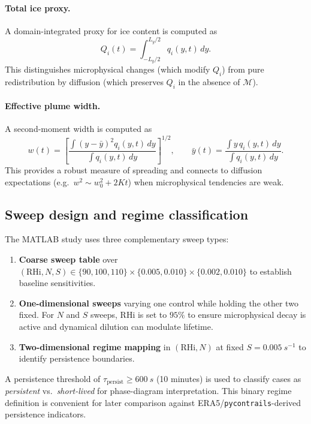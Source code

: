 \documentclass[11pt]{article}
\begin{document}
\paragraph{Total ice proxy.}
A domain-integrated proxy for ice content is computed as
\begin{equation}
Q_i(t)=\int_{-L_y/2}^{L_y/2} q_i(y,t)\,dy.
\label{eq:Qi}
\end{equation}
This distinguishes microphysical changes (which modify $Q_i$) from pure redistribution by diffusion (which preserves
$Q_i$ in the absence of $\mathcal{M}$).

\paragraph{Effective plume width.}
A second-moment width is computed as
\begin{equation}
w(t)=\left[\frac{\int (y-\bar{y})^2 q_i(y,t)\,dy}{\int q_i(y,t)\,dy}\right]^{1/2},
\qquad
\bar{y}(t)=\frac{\int y\,q_i(y,t)\,dy}{\int q_i(y,t)\,dy}.
\label{eq:width}
\end{equation}
This provides a robust measure of spreading and connects to diffusion expectations (e.g.\ $w^2 \sim w_0^2 + 2Kt$) \cite{Taylor1921,Fischer1979}
when microphysical tendencies are weak.

\subsection{Sweep design and regime classification}
\label{sec:matlab_sweeps}

The MATLAB study uses three complementary sweep types:
\begin{enumerate}
    \item \textbf{Coarse sweep table} over $(\mathrm{RHi},N,S)\in\{90,100,110\}\times\{0.005,0.010\}\times\{0.002,0.010\}$
    to establish baseline sensitivities.
    \item \textbf{One-dimensional sweeps} varying one control while holding the other two fixed. For $N$ and $S$ sweeps,
    RHi is set to $95\%$ to ensure microphysical decay is active and dynamical dilution can modulate lifetime.
    \item \textbf{Two-dimensional regime mapping} in $(\mathrm{RHi},N)$ at fixed $S=0.005~\si{s^{-1}}$ to identify persistence
    boundaries.
\end{enumerate}

A persistence threshold of $\tau_{\mathrm{persist}}\ge 600~\si{s}$ (10 minutes) is used to classify cases as
\emph{persistent} vs.\ \emph{short-lived} for phase-diagram interpretation. This binary regime definition is convenient
for later comparison against ERA5/\texttt{pycontrails}-derived persistence indicators.
\end{document}

